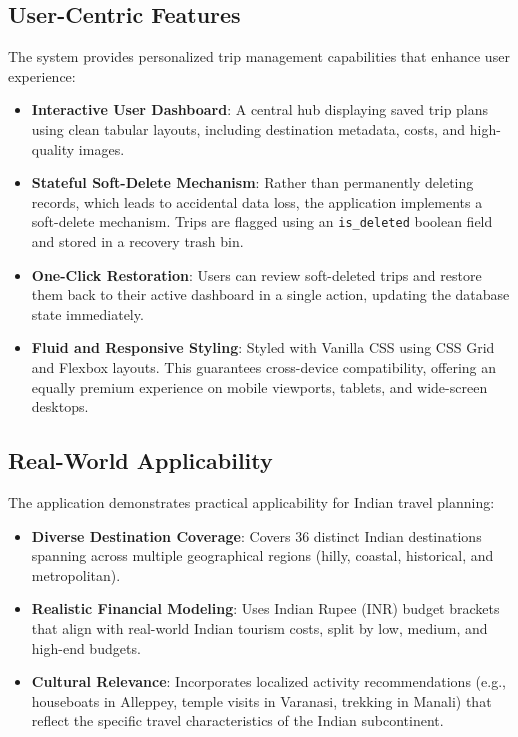 \subsection{User-Centric Features}

The system provides personalized trip management capabilities that enhance user experience:
\begin{itemize}
    \item \textbf{Interactive User Dashboard}: A central hub displaying saved trip plans using clean tabular layouts, including destination metadata, costs, and high-quality images.
    \item \textbf{Stateful Soft-Delete Mechanism}: Rather than permanently deleting records, which leads to accidental data loss, the application implements a soft-delete mechanism. Trips are flagged using an \texttt{is\_deleted} boolean field and stored in a recovery trash bin.
    \item \textbf{One-Click Restoration}: Users can review soft-deleted trips and restore them back to their active dashboard in a single action, updating the database state immediately.
    \item \textbf{Fluid and Responsive Styling}: Styled with Vanilla CSS using CSS Grid and Flexbox layouts. This guarantees cross-device compatibility, offering an equally premium experience on mobile viewports, tablets, and wide-screen desktops.
\end{itemize}

\subsection{Real-World Applicability}

The application demonstrates practical applicability for Indian travel planning:
\begin{itemize}
    \item \textbf{Diverse Destination Coverage}: Covers 36 distinct Indian destinations spanning across multiple geographical regions (hilly, coastal, historical, and metropolitan).
    \item \textbf{Realistic Financial Modeling}: Uses Indian Rupee (INR) budget brackets that align with real-world Indian tourism costs, split by low, medium, and high-end budgets.
    \item \textbf{Cultural Relevance}: Incorporates localized activity recommendations (e.g., houseboats in Alleppey, temple visits in Varanasi, trekking in Manali) that reflect the specific travel characteristics of the Indian subcontinent.
\end{itemize}

